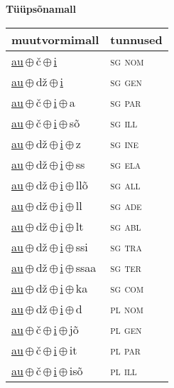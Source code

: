 

\vspace{3.5em}
\noindent \begin{minipage}{\textwidth}
\noindent \textbf{Tüüpsõnamall \,}\\

\begin{sideways}
\begin{tabular}{l l}
muutvormimall & tunnused \\
\hline
\underline{au}\,$\oplus$\,č\,$\oplus$\,\underline{i} & \textsc{ sg nom } \\
\underline{au}\,$\oplus$\,dž\,$\oplus$\,\underline{i} & \textsc{ sg gen } \\
\underline{au}\,$\oplus$\,č\,$\oplus$\,\underline{i}\,$\oplus$\,a & \textsc{ sg par } \\
\underline{au}\,$\oplus$\,č\,$\oplus$\,\underline{i}\,$\oplus$\,sõ & \textsc{ sg ill } \\
\underline{au}\,$\oplus$\,dž\,$\oplus$\,\underline{i}\,$\oplus$\,z & \textsc{ sg ine } \\
\underline{au}\,$\oplus$\,dž\,$\oplus$\,\underline{i}\,$\oplus$\,ss & \textsc{ sg ela } \\
\underline{au}\,$\oplus$\,dž\,$\oplus$\,\underline{i}\,$\oplus$\,llõ & \textsc{ sg all } \\
\underline{au}\,$\oplus$\,dž\,$\oplus$\,\underline{i}\,$\oplus$\,ll & \textsc{ sg ade } \\
\underline{au}\,$\oplus$\,dž\,$\oplus$\,\underline{i}\,$\oplus$\,lt & \textsc{ sg abl } \\
\underline{au}\,$\oplus$\,dž\,$\oplus$\,\underline{i}\,$\oplus$\,ssi & \textsc{ sg tra } \\
\underline{au}\,$\oplus$\,dž\,$\oplus$\,\underline{i}\,$\oplus$\,ssaa & \textsc{ sg ter } \\
\underline{au}\,$\oplus$\,dž\,$\oplus$\,\underline{i}\,$\oplus$\,ka & \textsc{ sg com } \\
\underline{au}\,$\oplus$\,dž\,$\oplus$\,\underline{i}\,$\oplus$\,d & \textsc{ pl nom } \\
\underline{au}\,$\oplus$\,č\,$\oplus$\,\underline{i}\,$\oplus$\,jõ & \textsc{ pl gen } \\
\underline{au}\,$\oplus$\,č\,$\oplus$\,\underline{i}\,$\oplus$\,it & \textsc{ pl par } \\
\underline{au}\,$\oplus$\,č\,$\oplus$\,\underline{i}\,$\oplus$\,isõ & \textsc{ pl ill } \\

\end{tabular}
\end{sideways}
\end{minipage}
